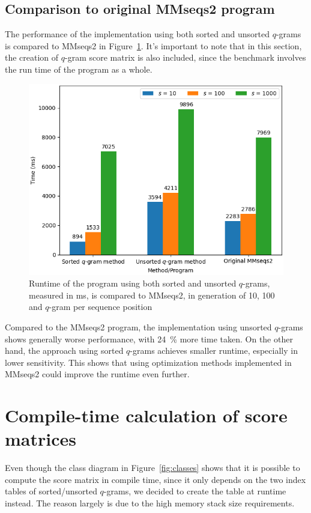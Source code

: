 \documentclass[twoside,a4paper,bsc]{master}
\newcommand{\Qgram}[1]{\(#1\)-gram}
\begin{document}
\subsection{Comparison to original MMseqs2 program}
The performance of the implementation using both sorted and unsorted
\Qgram{q}s
is compared to MMseqs2 in Figure~\ref{fig:mmseqs2comp}. It's important to note 
that in this section, the creation of \Qgram{q} score matrix is also included,
since the benchmark involves the run time of the program as a whole.

\begin{figure}
\centering
\includegraphics[scale=0.6]{graphics/mmseqs2comp.png}
\caption{Runtime of the program using both sorted and unsorted \Qgram{q}s,
measured in ms, is compared to MMseqs2, in generation of 10, 100 and 
\Qgram{q} per sequence position}
\label{fig:mmseqs2comp}
\end{figure}

Compared to the MMseqs2 program, the implementation using unsorted
\Qgram{q}s
shows generally worse performance, with 24~\% more time taken. On the other
hand,
the approach using sorted \Qgram{q}s achieves smaller runtime, especially
in
lower sensitivity. This shows that using optimization methods implemented
in MMseqs2 could improve the runtime even further.

\section{Compile-time calculation of
score matrices\label{section:scorematrix}}
Even though the class diagram in Figure~\ref{fig:classes} shows that it is
possible to compute the score matrix in compile time, since it only depends
on the two index tables of sorted/unsorted \Qgram{q}s, we decided to create 
the table at runtime instead. The reason largely is due
to the high memory stack size requirements.
\end{document}
